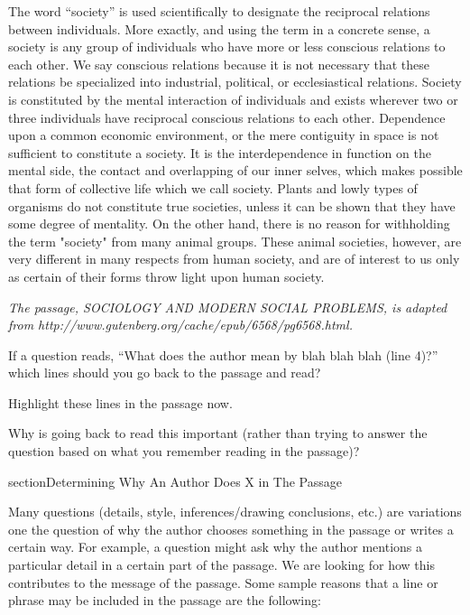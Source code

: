 \begin{linenumbers*}
\modulolinenumbers[5]
The word ``society'' is used scientifically to designate the reciprocal relations between individuals. More exactly, and using the term in a concrete sense, a society is any group of individuals who have more or less conscious relations to each other. We say conscious relations because it is not necessary that these relations be specialized into industrial, political, or ecclesiastical relations. Society is constituted by the mental interaction of individuals and exists wherever two or three individuals have reciprocal conscious relations to each other. Dependence upon a common economic environment, or the mere contiguity in space is not sufficient to constitute a society. It is the interdependence in function on the mental side, the contact and overlapping of our inner selves, which makes possible that form of collective life which we call society. Plants and lowly types of organisms do not constitute true societies, unless it can be shown that they have some degree of mentality. On the other hand, there is no reason for withholding the term "society" from many animal groups. These animal societies, however, are very different in many respects from human society, and are of interest to us only as certain of their forms throw light upon human society.
\end{linenumbers*}
\textit{The passage, SOCIOLOGY AND MODERN SOCIAL PROBLEMS, is adapted from http://www.gutenberg.org/cache/epub/6568/pg6568.html.}

\bigskip
If a question reads, ``What does the author mean by blah blah blah (line 4)?'' which lines should you go back to the passage and read? \hrulefill

Highlight these lines in the passage now. 

Why is going back to read this important (rather than trying to answer the question based on what you remember reading in the passage)? \hrulefill

section{Determining Why An Author Does X in The Passage}

Many questions (details, style, inferences/drawing conclusions, etc.) are variations one the question of why the author chooses something in the passage or writes a certain way. For example, a question might ask why the author mentions a particular detail in a certain part of the passage. We are looking for how this contributes to the message of the passage. Some sample reasons that a line or phrase may be included in the passage are the following:

